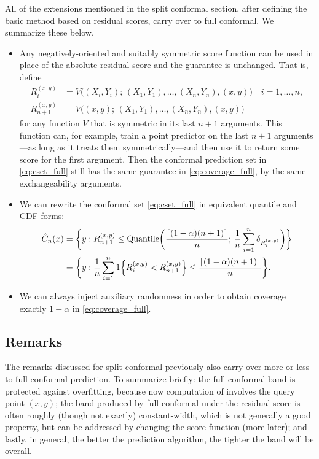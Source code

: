 \documentclass{article}
\begin{document}
All of the extensions mentioned in the split conformal section, after defining
the basic method based on residual scores, carry over to full conformal. We
summarize these below.

\begin{itemize}
\item Any negatively-oriented and suitably symmetric score function can be used
  in place of the absolute residual score and the guarantee is unchanged. That
  is, define 
  \begin{align*}
  R_i^{(x,y)} &= V\Big( (X_i,Y_i); \, (X_1,Y_1), \dots, (X_n,Y_n), (x,y) \Big)
  \quad i=1,\dots,n, \\ 
  R_{n+1}^{(x,y)} &= V\Big( (x,y); \, (X_1,Y_1), \dots, (X_n,Y_n), (x,y) \Big)
  \end{align*}
  for any function $V$ that is symmetric in its last $n+1$ arguments. This
  function can, for example, train a point predictor on the last $n+1$
  arguments---as long as it treats them symmetrically---and then use it to
  return some score for the first argument. Then the conformal prediction set in
  \eqref{eq:cset_full} still has the same guarantee in \eqref{eq:coverage_full},
  by the same exchangeability arguments. 

\item We can rewrite the conformal set \eqref{eq:cset_full} in equivalent
  quantile and CDF forms:
\begin{align}
\hat{C}_n(x) 
\label{eq:cset_quant_full}
&= \bigg\{ y : R^{(x,y)}_{n+1} \leq \mathrm{Quantile}\bigg( \frac{\lceil (1-\alpha)(n+1) 
  \rceil}{n}; \, \frac{1}{n} \sum_{i=1}^n \delta_{R_i^{(x,y)}} \bigg) \bigg\} \\ 
\label{eq:cset_cdf_full}
&= \bigg\{ y : \frac{1}{n} \sum_{i=1}^n 1\Big\{ R_i^{(x,y)} < R^{(x,y)}_{n+1}
  \Big\} \leq \frac{\lceil (1-\alpha)(n+1) \rceil}{n} \bigg\}.   
\end{align}

\item We can always inject auxiliary randomness in order to obtain coverage
  exactly $1-\alpha$ in \eqref{eq:coverage_full}.
\end{itemize}

\subsection{Remarks}

The remarks discussed for split conformal previously also carry over more or
less to full conformal prediction. To summarize briefly: the full conformal band
is protected against overfitting, because now computation of
 involves the query point $(x,y)$; the band produced by
full conformal under the residual score is often roughly (though not exactly)
constant-width, which is not generally a good property, but can be addressed by
changing the score function (more later); and lastly, in general, the better the
prediction algorithm, the tighter the band will be overall. 
\end{document}
